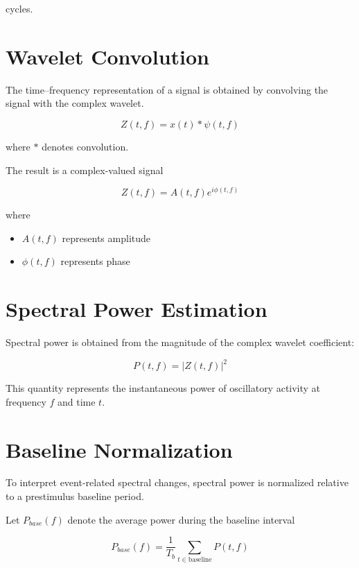 \documentclass[11pt]{report}
\begin{document}
cycles.

\section{Wavelet Convolution}

The time--frequency representation of a signal is obtained by
convolving the signal with the complex wavelet.

\begin{equation}
Z(t,f) =
x(t) * \psi(t,f)
\end{equation}

where $*$ denotes convolution.

The result is a complex-valued signal

\begin{equation}
Z(t,f) = A(t,f)e^{i\phi(t,f)}
\end{equation}

where

\begin{itemize}
\item $A(t,f)$ represents amplitude
\item $\phi(t,f)$ represents phase
\end{itemize}

\section{Spectral Power Estimation}

Spectral power is obtained from the magnitude of the complex
wavelet coefficient:

\begin{equation}
P(t,f) =
|Z(t,f)|^2
\end{equation}

This quantity represents the instantaneous power of oscillatory
activity at frequency $f$ and time $t$.

\section{Baseline Normalization}

To interpret event-related spectral changes, spectral power is
normalized relative to a prestimulus baseline period.

Let $P_{base}(f)$ denote the average power during the baseline
interval

\begin{equation}
P_{base}(f) =
\frac{1}{T_b}
\sum_{t \in \text{baseline}} P(t,f)
\end{equation}
\end{document}
